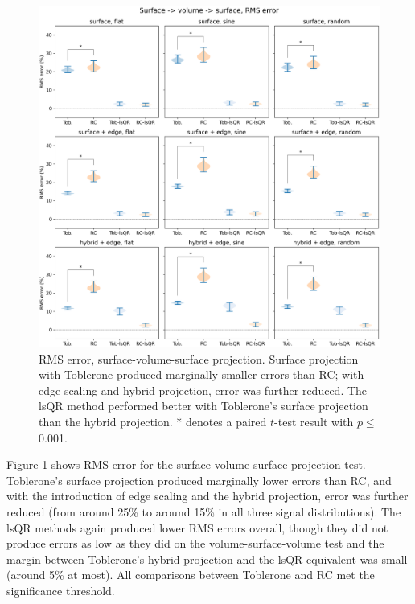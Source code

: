 \documentclass[12pt]{report}
\begin{document}
\begin{figure}[H]
\centering
\includegraphics[width=\textwidth]{SVS_violins}
\caption{RMS error, surface-volume-surface projection. Surface projection with Toblerone produced marginally smaller errors than RC; with edge scaling and hybrid projection, error was further reduced. The lsQR method performed better with Toblerone's surface projection than the hybrid projection. * denotes a paired $t$-test result with $p\leq $ 0.001.}
\label{SVS_rms} 
\end{figure}

Figure \ref{SVS_rms} shows RMS error for the surface-volume-surface projection test. Toblerone's surface projection produced marginally lower errors than RC, and with the introduction of edge scaling and the hybrid projection, error was further reduced (from around 25\% to around 15\% in all three signal distributions). The lsQR methods again produced lower RMS errors overall, though they did not produce errors as low as they did on the volume-surface-volume test and the margin between Toblerone's hybrid projection and the lsQR equivalent was small (around 5\% at most). All comparisons  between Toblerone and RC met the significance threshold. 
\end{document}
